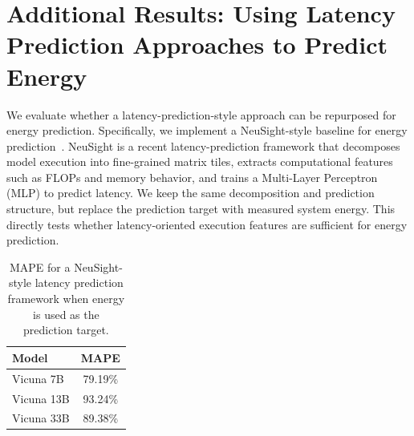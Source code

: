 





\section{Additional Results: Using Latency Prediction Approaches to Predict Energy}
\label{app:latency-ablation}
We evaluate whether a latency-prediction-style approach can be repurposed for energy prediction. 
Specifically, we implement a NeuSight-style baseline for energy prediction~\cite{neusight}. 
NeuSight is a recent latency-prediction framework that decomposes model execution into fine-grained matrix tiles, extracts computational features such as FLOPs and memory behavior, and trains a Multi-Layer Perceptron (MLP) to predict latency. 
We keep the same decomposition and prediction structure, but replace the prediction target with measured system energy. 
This directly tests whether latency-oriented execution features are sufficient for energy prediction.

\begin{table}[t]
\centering
\small
\setlength{\tabcolsep}{6pt}
\renewcommand{\arraystretch}{1.05}

\begin{tabular}{l|c}
\hline
\textbf{Model} & \textbf{MAPE} \tabularnewline
\hline
\rowcolor{rowblue} Vicuna 7B  & 79.19\% \tabularnewline
Vicuna 13B                    & 93.24\% \tabularnewline
\rowcolor{rowblue} Vicuna 33B & 89.38\% \tabularnewline
\hline
\end{tabular}
\vspace{-6pt}
\caption{MAPE for a NeuSight-style latency prediction framework when energy is used as the prediction target.}
\vspace{-6pt}
\label{tab:neusight_energy_target}
\end{table}

